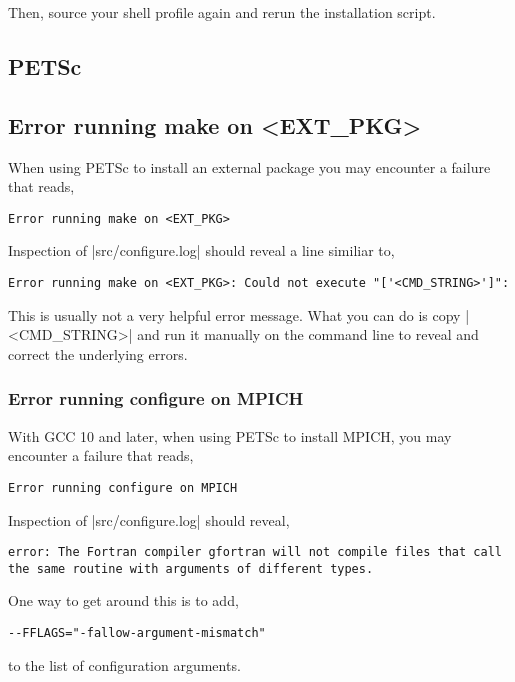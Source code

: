 Then, source your shell profile again and rerun the installation script.

\subsection*{PETSc}
\subsection*{Error running make on <EXT\_PKG>}%
When using PETSc to install an external package you may encounter a failure that reads,
\begin{lstlisting}
Error running make on <EXT_PKG>
\end{lstlisting}

Inspection of \lstinlinebg|src/configure.log| should reveal a line similiar to,
\begin{lstlisting}
Error running make on <EXT_PKG>: Could not execute "['<CMD_STRING>']":
\end{lstlisting}
This is usually not a very helpful error message. What you can do is copy \lstinlinebg|<CMD_STRING>| and run it manually on the command line to reveal and correct the underlying errors.

\subsubsection{Error running configure on MPICH}%
With GCC 10 and later, when using PETSc to install MPICH, you may encounter a failure that reads,
\begin{lstlisting}
Error running configure on MPICH
\end{lstlisting}

Inspection of \lstinlinebg|src/configure.log| should reveal,
\begin{lstlisting}
error: The Fortran compiler gfortran will not compile files that call
the same routine with arguments of different types.
\end{lstlisting}
One way to get around this is to add,
\begin{lstlisting}
--FFLAGS="-fallow-argument-mismatch"
\end{lstlisting}
to the list of configuration arguments.

